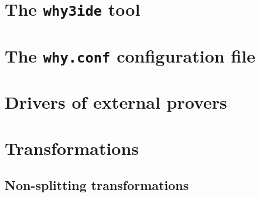 \section{The \texttt{why3ide} tool}

\section{The \texttt{why.conf} configuration file}

\section{Drivers of external provers}

\section{Transformations}

\subsection{Non-splitting transformations}

